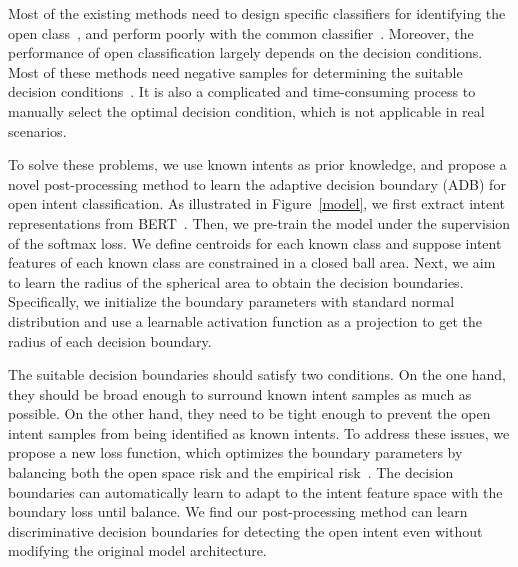 \documentclass[letterpaper]{article} %
\begin{document}
Most of the existing methods need to design specific classifiers for identifying the open class~\cite{bendale2016towards,Shu2017DOCDO,lin-xu-2019-deep}, and perform poorly with the common classifier~\cite{hendrycks17baseline}. Moreover, the performance of open classification largely depends on the  decision conditions. Most of these methods need negative samples for determining the suitable decision conditions~\cite{scheirer2013toward,fei-liu-2016-breaking,hendrycks17baseline,liang2018enhancing}. It is also a complicated and time-consuming process to manually select the optimal decision condition, which is not applicable in real scenarios.

To solve these problems, we use known intents as prior knowledge, and propose a novel post-processing method to learn the adaptive decision boundary (ADB) for open intent classification. As illustrated in Figure~\ref{model}, we first extract intent representations from BERT~\cite{devlin2019bert}. Then, we pre-train the model under the supervision of the softmax loss. We define centroids for each known class and suppose intent features of each known class are constrained in a closed ball area. Next, we aim to learn the radius of the spherical area to obtain the decision boundaries. Specifically, we initialize the boundary parameters with standard normal distribution and use a learnable activation function as a projection to get the radius of each decision boundary.

The suitable decision boundaries should satisfy two conditions. On the one hand, they should be broad enough to surround known intent samples as much as possible. On the other hand, they need to be tight enough to prevent the open intent samples from being identified as known intents. To address these issues, we propose a new loss function, which optimizes the boundary parameters by balancing both the open space risk and the empirical risk~\cite{scheirer2013toward}. The decision boundaries can automatically learn to adapt to the intent feature space with the boundary loss until balance. We find our post-processing method can learn discriminative decision boundaries for detecting the open intent even without modifying the original model architecture.
\end{document}
